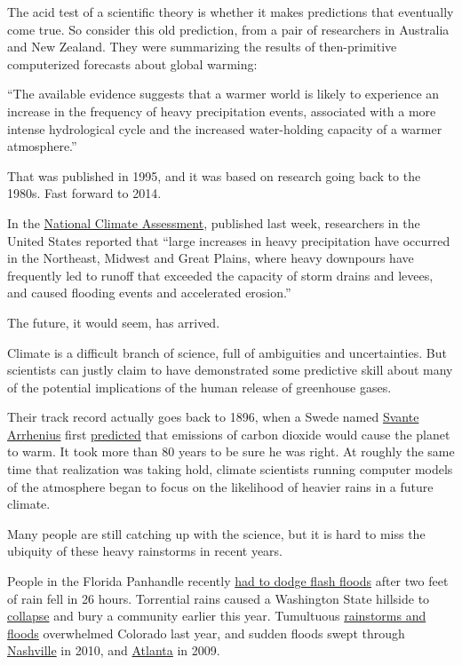 The acid test of a scientific theory is whether it makes predictions
that eventually come true. So consider this old prediction, from a pair
of researchers in Australia and New Zealand. They were summarizing the
results of then-primitive computerized forecasts about global warming:

``The available evidence suggests that a warmer world is likely to
experience an increase in the frequency of heavy precipitation events,
associated with a more intense hydrological cycle and the increased
water-holding capacity of a warmer atmosphere.''

That was published in 1995, and it was based on research going back to
the 1980s. Fast forward to 2014.

In the \href{http://nca2014.globalchange.gov/}{National Climate
Assessment}, published last week, researchers in the United States
reported that ``large increases in heavy precipitation have occurred in
the Northeast, Midwest and Great Plains, where heavy downpours have
frequently led to runoff that exceeded the capacity of storm drains and
levees, and caused flooding events and accelerated erosion.''

The future, it would seem, has arrived.

Climate is a difficult branch of science, full of ambiguities and
uncertainties. But scientists can justly claim to have demonstrated some
predictive skill about many of the potential implications of the human
release of greenhouse gases.

Their track record actually goes back to 1896, when a Swede named
\href{http://earthobservatory.nasa.gov/Features/Arrhenius/}{Svante
Arrhenius} first
\href{http://www.globalwarmingart.com/images/1/18/Arrhenius.pdf}{predicted}
that emissions of carbon dioxide would cause the planet to warm. It took
more than 80 years to be sure he was right. At roughly the same time
that realization was taking hold, climate scientists running computer
models of the atmosphere began to focus on the likelihood of heavier
rains in a future climate.

Many people are still catching up with the science, but it is hard to
miss the ubiquity of these heavy rainstorms in recent years.

People in the Florida Panhandle recently
\href{http://www.nytimes3xbfgragh.onion/2014/05/01/us/severe-flooding-in-south-and-midwest-as-storm-system-tapers-off.html?_r=0}{had
to dodge flash floods} after two feet of rain fell in 26 hours.
Torrential rains caused a Washington State hillside to
\href{http://www.nytimes3xbfgragh.onion/2014/03/25/us/search-continues-after-washington-state-landslide.html}{collapse}
and bury a community earlier this year. Tumultuous
\href{http://www.nytimes3xbfgragh.onion/2013/09/14/us/colorado-flooding.html}{rainstorms
and floods} overwhelmed Colorado last year, and sudden floods swept
through
\href{http://www.nytimes3xbfgragh.onion/2010/05/04/us/04flood.html?_r=1\&adxnnl=1\&adxnnlx=1399809918-8on824VB1bK8a1dRDBI2Bg}{Nashville}
in 2010, and
\href{http://www.cnn.com/2009/TECH/science/09/22/atlanta.weather.science/}{Atlanta}
in 2009.

